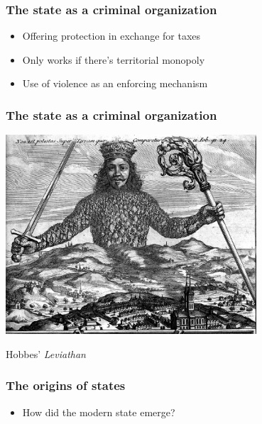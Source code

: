\documentclass[aspectratio=43, handout]{beamer}
\begin{document}
\begin{frame}
\frametitle{The state as a criminal organization}
\centering

\begin{itemize}
  \item Offering protection in exchange for taxes
  \item Only works if there's territorial monopoly
  \item Use of violence as an enforcing mechanism
\end{itemize}

\end{frame}

\begin{frame}
\frametitle{The state as a criminal organization}
\centering

\includegraphics[width = 0.7\textwidth]{img/leviathan}

\vspace{20pt}

{\small Hobbes' \textit{Leviathan}}

\end{frame}


\begin{frame}
\frametitle{The origins of states}
\centering

\begin{itemize}
  \item How did the modern state emerge?
\end{itemize}

\end{frame}
\end{document}
